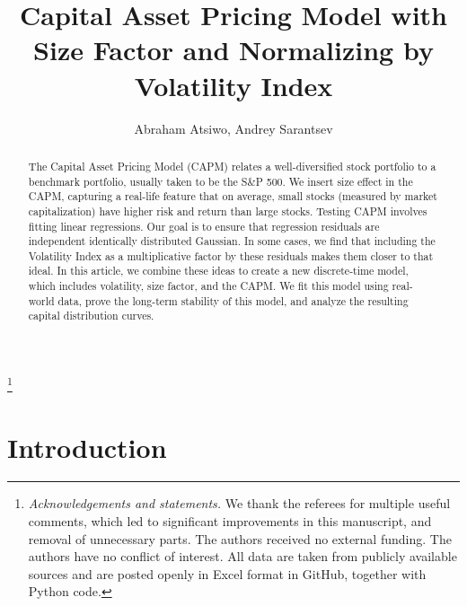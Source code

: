 \documentclass[12pt]{amsart}
\begin{document}
\title[CAPM with Size and Volatility]{Capital Asset Pricing Model with Size Factor and Normalizing by Volatility Index}
\author{Abraham Atsiwo, Andrey Sarantsev}

\begin{abstract}
The Capital Asset Pricing Model (CAPM) relates a well-diversified stock portfolio to a benchmark portfolio, usually taken to be the S\&P 500. We insert size effect in the CAPM, capturing a real-life feature that on average, small stocks (measured by market capitalization) have higher risk and return than large stocks. Testing CAPM involves fitting linear regressions. Our goal is to ensure that regression residuals are independent identically distributed Gaussian. In some cases, we find that including the Volatility Index as a multiplicative factor by these residuals makes them closer to that ideal. In this article, we combine these ideas to create a new discrete-time model, which includes volatility, size factor, and the CAPM. We fit this model using real-world data, prove the long-term stability of this model, and analyze the resulting capital distribution curves.  
\end{abstract}



\thanks{\textit{Acknowledgements and statements.} We thank the referees for multiple useful comments, which led to significant improvements in this manuscript, and removal of unnecessary parts. The authors received no external funding. The authors have no conflict of interest. All data are taken from publicly available sources and are posted openly in Excel format in GitHub, together with Python code.}

\maketitle

\newtheorem{theorem}{Theorem}
\newtheorem{lemma}{Lemma}
\theoremstyle{definition}
\newtheorem{asmp}{Assumption}
\newtheorem{defn}{Definition}
\thispagestyle{empty}

\section{Introduction} 
\end{document}

